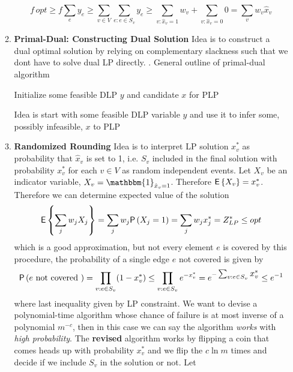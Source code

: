 \documentclass[11pt]{article}
\begin{document}
\begin{enumerate}
\begin{enumerate}
\[            f \, opt 
            \geq f \sum_e  y_e 
            \geq \sum_{v\in V} \sum_{e: e\in S_v} y_e 
            \geq \sum_{v:\hat{x}_v=1} w_v + \sum_{v:\hat{x}_v=0} 0
            = \sum_v w_v \hat{x}_v
        \]
        \item \textbf{Primal-Dual: Constructing Dual Solution} Idea is to construct a dual optimal solution by relying on complementary slackness such that we dont have to solve dual LP directly. . General outline of primal-dual algorithm  \\
        \begin{center}
            \begin{algorithm}[H]
                Initialize some feasible DLP $y$ and candidate $x$ for PLP\\ 
            \end{algorithm}
        \end{center}
        Idea is start with some feasible DLP variable $y$ and use it to infer some, possibly infeasible, $x$ to PLP
        \item \textbf{Randomized Rounding} Idea is to interpret LP solution $x^*_v$ as probability that $\hat{x}_v$ is set to 1, i.e. $S_v$ included in the final solution with probability $x^*_v$ for each $v\in V$ as random independent events. Let $X_v$ be an indicator variable, $X_v = \mathbbm{1}_{\hat{x}_v =1}$. Therefore $\E{X_v} = x_v^*$. Therefore we can determine expected value of the solution 
        \[
            \E{\sum_{j} w_j X_j} = \sum_j w_j \P{X_j=1} = \sum_j w_j x_j^* = Z_{LP}^* \leq opt
        \]
        which is a good approximation, but not every element $e$ is covered by this procedure, the probability of a single edge $e$ not covered is given by 
        \[
            \P{e \text{ not covered }} 
            = \prod_{v: e\in S_v} (1 - x_v^*)
            \leq \prod_{v: e\in S_v} e^{-x_v^*}
            = e^{-\textstyle\sum_{v: e\in S_v} x_v^*} 
            \leq e^{-1}
        \]
        where last inequality given by LP constraint. We want to devise a polynomial-time algorithm whose chance of failure is at most inverse of a polynomial $m^{-c}$, then in this case we can say the algorithm \textit{works} with \textit{high probability}. The \textbf{revised} algorithm works by flipping a coin that comes heads up with probability $x_v^*$ and we flip the $c\ln m$ times and decide if we include $S_v$ in the solution or not. Let 

\end{enumerate}
\end{enumerate}
\end{document}
